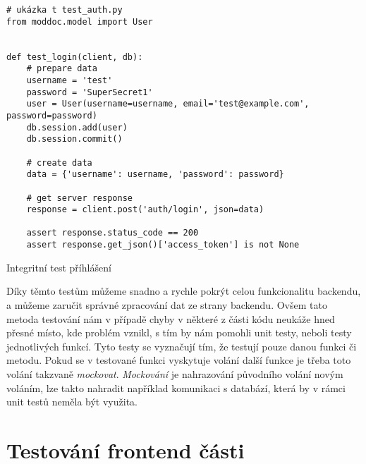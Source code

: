 \begin{listing}[H]
    \begin{verbatim}
# ukázka t test_auth.py
from moddoc.model import User


def test_login(client, db):
    # prepare data
    username = 'test'
    password = 'SuperSecret1'
    user = User(username=username, email='test@example.com', password=password)
    db.session.add(user)
    db.session.commit()

    # create data
    data = {'username': username, 'password': password}

    # get server response
    response = client.post('auth/login', json=data)

    assert response.status_code == 200
    assert response.get_json()['access_token'] is not None
    \end{verbatim}
    \caption{Integritní test příhlášení}
    \label{lst:authTest}
\end{listing}

Díky těmto testům můžeme snadno a rychle pokrýt celou funkcionalitu backendu, a můžeme zaručit správné zpracování dat ze strany backendu.
Ovšem tato metoda testování nám v případě chyby v některé z části kódu neukáže hned přesné místo, kde problém vznikl, s tím by nám pomohli
unit testy, neboli testy jednotlivých funkcí. Tyto testy se vyznačují tím, že testují pouze danou funkci či metodu. Pokud se v testované funkci
vyskytuje volání další funkce je třeba toto volání takzvaně \textit{mockovat}. \textit{Mockování} je nahrazování původního volání novým voláním,
lze takto nahradit například komunikaci s databází, která by v rámci unit testů neměla být využita.

\section{Testování frontend části}

